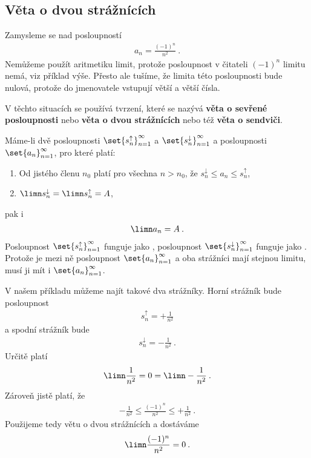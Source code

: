 \subsection*{Věta o dvou strážnících}

Zamysleme se nad posloupností
\begin{align}
    a_n = \frac{(-1)^n}{n^2} \:.
\end{align}
Nemůžeme použít aritmetiku limit, protože posloupnost v čitateli $(-1)^n$ limitu nemá, viz příklad výše. Přesto ale tušíme, že limita této posloupnosti bude nulová, protože do jmenovatele vstupují větší a větší čísla.

V těchto situacích se používá tvrzení, které se nazývá \textbf{věta o sevřené posloupnosti} nebo \textbf{věta o dvou strážnících} nebo též \textbf{věta o sendviči}.

Máme-li dvě posloupnosti $\set{s^{\uparrow}_n}_{n=1}^\infty$ a $\set{s^{\downarrow}_n}_{n=1}^\infty$ a posloupnosti $\set{a_n}_{n=1}^\infty$, pro které platí:
\begin{enumerate}
    \item Od jistého členu $n_0$ platí pro všechna $n>n_0$, že $s^{\downarrow}_n \leq a_n \leq s^{\uparrow}_n$,
    \item $\limn s_n^{\downarrow} = \limn s_n^{\uparrow} = A$,
\end{enumerate}
pak i \begin{align}
    \limn a_n = A \:.
\end{align}
Posloupnost $\set{s^{\uparrow}_n}_{n=1}^\infty$ funguje jako , posloupnost $\set{s^{\downarrow}_n}_{n=1}^\infty$ funguje jako . Protože je mezi ně posloupnost $\set{a_n}_{n=1}^\infty$  a oba strážníci mají stejnou limitu, musí ji mít i $\set{a_n}_{n=1}^\infty$.

V našem příkladu můžeme najít takové dva strážníky. Horní strážník bude posloupnost
\begin{align}
    s_n^{\uparrow} = + \frac{1}{n^2}
\end{align}
a spodní strážník bude
\begin{align}
    s_n^{\downarrow} = - \frac{1}{n^2} \:.
\end{align}
Určitě platí \begin{align}
    \limn \frac{1}{n^2} = 0 = \limn -\frac{1}{n^2} \:.
\end{align}
Zároveň jistě platí, že \begin{align}
    -\frac{1}{n^2} \leq \frac{(-1)^n}{n^2} \leq +\frac{1}{n^2} \:.
\end{align}
Použijeme tedy větu o dvou strážnících a dostáváme
\begin{align}
    \limn \frac{(-1)^n}{n^2} = 0 \:.
\end{align}


